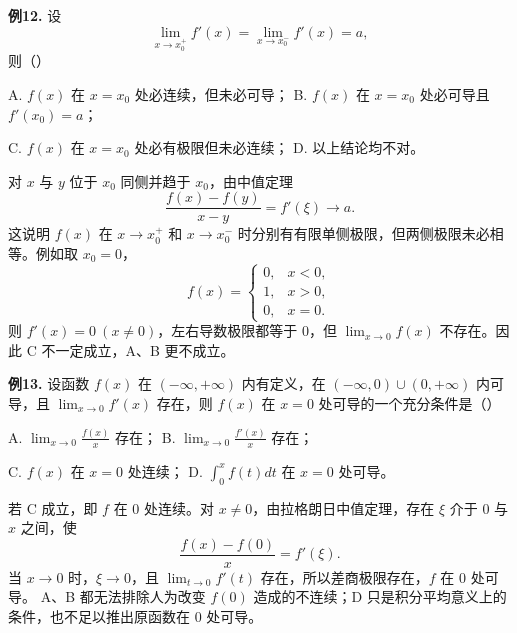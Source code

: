\begin{problemblock}
\textbf{例12.} 设
\[
\lim_{x\to x_0^+}f'(x)=\lim_{x\to x_0^-}f'(x)=a,
\]
则（\quad）

A. \(f(x)\) 在 \(x=x_0\) 处必连续，但未必可导；
B. \(f(x)\) 在 \(x=x_0\) 处必可导且 \(f'(x_0)=a\)；

C. \(f(x)\) 在 \(x=x_0\) 处必有极限但未必连续；
D. 以上结论均不对。
\end{problemblock}
\begin{solutionblock}
对 \(x\) 与 \(y\) 位于 \(x_0\) 同侧并趋于 \(x_0\)，由中值定理
\[
\frac{f(x)-f(y)}{x-y}=f'(\xi)\to a.
\]
这说明 \(f(x)\) 在 \(x\to x_0^+\) 和 \(x\to x_0^-\) 时分别有有限单侧极限，但两侧极限未必相等。例如取 \(x_0=0\)，
\[
f(x)=
\begin{cases}
0,&x<0,\\
1,&x>0,\\
0,&x=0.
\end{cases}
\]
则 \(f'(x)=0\ (x\ne0)\)，左右导数极限都等于 \(0\)，但 \(\lim_{x\to0}f(x)\) 不存在。因此 C 不一定成立，A、B 更不成立。
\end{solutionblock}

\begin{problemblock}
\textbf{例13.} 设函数 \(f(x)\) 在 \((-
\infty,+\infty)\) 内有定义，在 \((-
\infty,0)\cup(0,+\infty)\) 内可导，且 \(\lim_{x\to0}f'(x)\) 存在，则 \(f(x)\) 在 \(x=0\) 处可导的一个充分条件是（\quad）

A. \(\displaystyle\lim_{x\to0}\frac{f(x)}x\) 存在；
B. \(\displaystyle\lim_{x\to0}\frac{f'(x)}x\) 存在；

C. \(f(x)\) 在 \(x=0\) 处连续；
D. \(\displaystyle\int_0^x f(t)dt\) 在 \(x=0\) 处可导。
\end{problemblock}
\begin{solutionblock}
若 C 成立，即 \(f\) 在 0 处连续。对 \(x\ne0\)，由拉格朗日中值定理，存在 \(\xi\) 介于 0 与 \(x\) 之间，使
\[
\frac{f(x)-f(0)}x=f'(\xi).
\]
当 \(x\to0\) 时，\(\xi\to0\)，且 \(\lim_{t\to0}f'(t)\) 存在，所以差商极限存在，\(f\) 在 0 处可导。
A、B 都无法排除人为改变 \(f(0)\) 造成的不连续；D 只是积分平均意义上的条件，也不足以推出原函数在 0 处可导。
\end{solutionblock}

